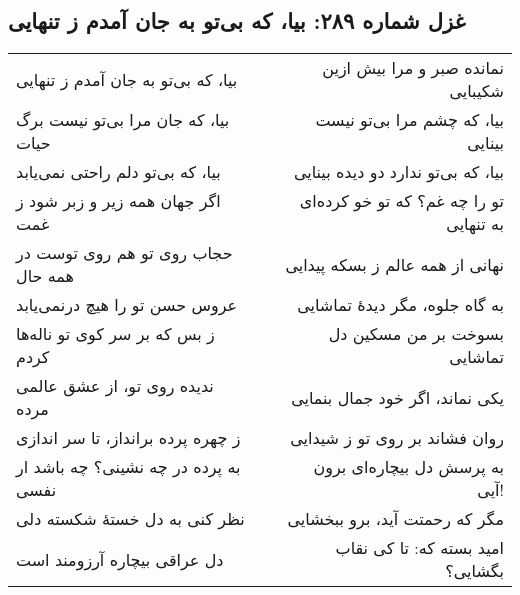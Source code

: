 \begin{center}
\section*{غزل شماره ۲۸۹: بیا، که بی‌تو به جان آمدم ز تنهایی}
\label{sec:289}
\begin{longtable}{l p{0.5cm} r}
بیا، که بی‌تو به جان آمدم ز تنهایی
&&
نمانده صبر و مرا بیش ازین شکیبایی
\\
بیا، که جان مرا بی‌تو نیست برگ حیات
&&
بیا، که چشم مرا بی‌تو نیست بینایی
\\
بیا، که بی‌تو دلم راحتی نمی‌یابد
&&
بیا، که بی‌تو ندارد دو دیده بینایی
\\
اگر جهان همه زیر و زبر شود ز غمت
&&
تو را چه غم؟ که تو خو کرده‌ای به تنهایی
\\
حجاب روی تو هم روی توست در همه حال
&&
نهانی از همه عالم ز بسکه پیدایی
\\
عروس حسن تو را هیچ درنمی‌یابد
&&
به گاه جلوه، مگر دیدهٔ تماشایی
\\
ز بس که بر سر کوی تو ناله‌ها کردم
&&
بسوخت بر من مسکین دل تماشایی
\\
ندیده روی تو، از عشق عالمی مرده
&&
یکی نماند، اگر خود جمال بنمایی
\\
ز چهره پرده برانداز، تا سر اندازی
&&
روان فشاند بر روی تو ز شیدایی
\\
به پرده در چه نشینی؟ چه باشد ار نفسی
&&
به پرسش دل بیچاره‌ای برون آیی!
\\
نظر کنی به دل خستهٔ شکسته دلی
&&
مگر که رحمتت آید، برو ببخشایی
\\
دل عراقی بیچاره آرزومند است
&&
امید بسته که: تا کی نقاب بگشایی؟
\\
\end{longtable}
\end{center}

